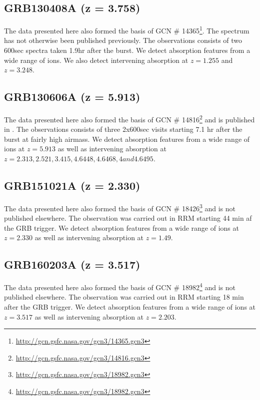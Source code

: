 \documentclass[iop, twocolappendix, numberedappendix, tighten, appendixfloats]{emulateapj}
\begin{document}
    \subsection{GRB130408A (z = 3.758)}
	The data presented here also formed the basis of GCN \#
	14365\footnote{\url{http://gcn.gsfc.nasa.gov/gcn3/14365.gcn3}}. The spectrum
	has not otherwise been published previously. The observations consists of two
	600sec spectra taken 1.9hr after the burst. We detect absorption features from
	a wide range of ions. We also detect intervening absorption at $z=1.255$ and
	$z=3.248$.
	
	\subsection{GRB130606A (z = 5.913)}
	The data presented here also formed the basis of GCN \#
	14816\footnote{\url{http://gcn.gsfc.nasa.gov/gcn3/14816.gcn3}} and is published
	in \citet{Hartoog2015}. The observations consists of three 2x600sec visits
	starting 7.1 hr after the burst at fairly high airmass. We detect absorption
	features from a wide range of ions at $z=5.913$ as well as intervening
	absorption at $z=2.313, 2.521, 3.415, 4.6448, 4.6468, 4 and 4.6495$.
	
	\subsection{GRB151021A (z = 2.330)}
	The data presented here also formed the basis of GCN \#
	18426\footnote{\url{http://gcn.gsfc.nasa.gov/gcn3/18982.gcn3}} and is not
	published elsewhere. The observation was carried out in RRM starting 44 min af
	the GRB trigger. We detect absorption features from a wide range of ions at
	$z=2.330$ as well as intervening absorption at $z=1.49$.

	\subsection{GRB160203A (z = 3.517)}
	The data presented here also formed the basis of GCN \#
	18982\footnote{\url{http://gcn.gsfc.nasa.gov/gcn3/18982.gcn3}} and is not
	published elsewhere. The observation was carried out in RRM starting 18 min
	after the GRB trigger. We detect absorption features from a wide range of ions
	at $z=3.517$ as well as intervening absorption at $z=2.203$.
	
\end{document}
